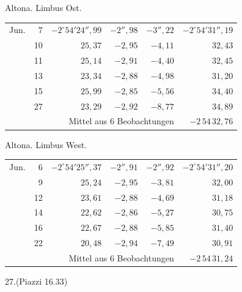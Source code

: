 \noindent\begin{minipage}[t]{.495\textwidth}\centering Altona. Limbus Ost.\par\smallskip
{\scriptsize\setlength{\tabcolsep}{1pt}\renewcommand{\arraystretch}{1.2}\begin{tabular}{lr|r|r|r|r|}
Jun.&7&$-2^\circ54'24''{,}99$&$-2''{,}98$&$-3''{,}22$&$-2^\circ54'31''{,}19$\\
&10&$25{,}37$&$-2{,}95$&$-4{,}11$&$32{,}43$\\
&11&$25{,}14$&$-2{,}91$&$-4{,}40$&$32{,}45$\\
&13&$23{,}34$&$-2{,}88$&$-4{,}98$&$31{,}20$\\
&15&$25{,}99$&$-2{,}85$&$-5{,}56$&$34{,}40$\\
&27&$23{,}29$&$-2{,}92$&$-8{,}77$&$34{,}89$\\
\cline{6-6}\multicolumn{5}{r}{Mittel aus 6 Beobachtungen}&$-2\,54\,32{,}76$
\end{tabular}}\end{minipage}\hfill\begin{minipage}[t]{.495\textwidth}\centering Altona. Limbus West.\par\smallskip
{\scriptsize\setlength{\tabcolsep}{1pt}\renewcommand{\arraystretch}{1.2}\begin{tabular}{lr|r|r|r|r}
Jun.&6&$-2^\circ54'25''{,}37$&$-2''{,}91$&$-2''{,}92$&$-2^\circ54'31''{,}20$\\
&9&$25{,}24$&$-2{,}95$&$-3{,}81$&$32{,}00$\\
&12&$23{,}61$&$-2{,}88$&$-4{,}69$&$31{,}18$\\
&14&$22{,}62$&$-2{,}86$&$-5{,}27$&$30{,}75$\\
&16&$22{,}67$&$-2{,}88$&$-5{,}85$&$31{,}40$\\
&22&$20{,}48$&$-2{,}94$&$-7{,}49$&$30{,}91$\\
\cline{6-6}\multicolumn{5}{r}{Mittel aus 6 Beobachtungen}&$-2\,54\,31{,}24$
\end{tabular}}\end{minipage}
\par\vspace{4mm}
\begin{center}27.\quad (Piazzi 16.33)\end{center}

